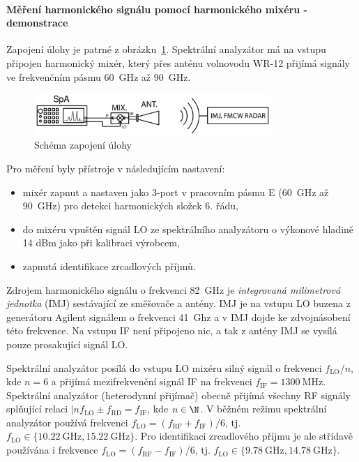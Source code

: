 \documentclass[11pt,a4paper]{article}
\newcommand{\MHz}{\mathrm{MHz}}
\newcommand{\GHz}{\mathrm{GHz}}
\begin{document}
\paragraph*{Měření harmonického signálu pomocí harmonického mixéru - demonstrace} Zapojení úlohy je patrné z obrázku~\ref{fig:task3-zapojeni}. Spektrální analyzátor má na vstupu připojen harmonický mixér, který přes anténu volnovodu WR-12 přijímá signály ve frekvenčním pásmu 60~GHz až 90~GHz.
\begin{figure}[!ht]
    \centering
    \includegraphics[width=0.8\textwidth]{src/task3-zapojeni.png}
    \caption{\label{fig:task3-zapojeni}Schéma zapojení úlohy}
\end{figure}
Pro měření byly přístroje v následujícím nastavení:
\begin{itemize}
    \item mixér zapnut a nastaven jako 3-port v pracovním pásmu E (60~GHz až 90~GHz) pro detekci harmonických složek 6. řádu,
    \item do mixéru vpuštěn signál LO ze spektrálního analyzátoru o výkonové hladině 14 dBm jako při kalibraci výrobcem,
    \item zapnutá identifikace zrcadlových příjmů.
\end{itemize}
Zdrojem harmonického signálu o frekvenci 82~GHz je \emph{integrovaná milimetrová jednotka} (IMJ) sestávající ze směšovače a antény. IMJ je na vstupu LO buzena z generátoru Agilent signálem o frekvenci 41~Ghz a v IMJ dojde ke zdvojnásobení této frekvence. Na vstupu IF není připojeno nic, a tak z antény IMJ se vysílá pouze prosakující signál LO.

Spektrální analyzátor posílá do vstupu LO mixéru silný signál o frekvenci $f_{\mathrm{LO}}/n$, kde $n=6$ a přijímá mezifrekvenční signál IF na frekvenci $f_{\mathrm{IF}} = 1300\ \MHz$. Spektrální analyzátor (heterodynní přijímač) obecně přijímá všechny RF signály splňující relaci $|nf_{\mathrm{LO}}\pm f_{\mathrm{RD}} = f_{\mathrm{IF}}$, kde $n \in \N$. V běžném režimu spektrální analyzátor používá frekvenci $f_{\mathrm{LO}} = (f_{\mathrm{RF}}+f_{\mathrm{IF}})/6$, tj. $f_{\mathrm{LO}} \in \{10.22\ \GHz,15.22\ \GHz\}$. Pro identifikaci zrcadlového příjmu je ale střídavě používána i frekvence $f_{\mathrm{LO}} = (f_{\mathrm{RF}} - f_{\mathrm{IF}})/6$, tj. $f_{\mathrm{LO}} \in \{9.78\ \GHz, 14.78\ \GHz\}$.
\end{document}
